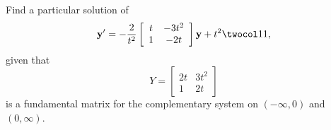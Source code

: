 \setcounter{example}{2}
\setcounter{equation}{6}
\begin{example}
  \label{example:10.7.3} \rm Find a particular solution of
  \begin{equation}
    \label{eq:10.7.7}{\bf y}'=-\frac{2}{t^{2}}\left[
    \begin{array}{cc}
      t & -3t^{2} \\
      1 & -2t
    \end{array}\right]{\bf y}+t^{2}\twocol11,
  \end{equation}
  given that
  \[
    Y=\left[
    \begin{array}{cc}
      2t & 3t^{2} \\
      1  & 2t
    \end{array}\right]
  \]
  is a fundamental matrix for the complementary system on $(-\infty,0)$ and $(0,\infty)$.
\end{example}
